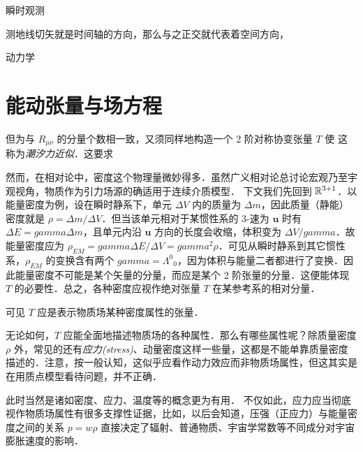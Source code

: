 瞬时观测




测地线切矢就是时间轴的方向，那么与之正交就代表着空间方向，


动力学





\section{能动张量与场方程}

但为与 $R_{\mu\nu}$ 的分量个数相一致，又须同样地构造一个 2 阶对称协变张量 $T$ 使
这称为\textit{潮汐力近似}．这要求

然而，在相对论中，密度这个物理量微妙得多．虽然广义相对论总讨论宏观乃至宇观视角，物质作为引力场源的确适用于连续介质模型．
下文我们先回到 $\mathbb{R}^{3+1}$．以能量密度为例，设在瞬时静系下，单元 $\Delta V$ 内的质量为 $\Delta m$，因此质量（静能）密度就是 $\rho=\Delta m/\Delta V$．但当该单元相对于某惯性系的 3-速为 $\bm{u}$ 时有 $\Delta E=gamma \Delta m$，且单元内沿 $\bm u$ 方向的长度会收缩，体积变为 $\Delta V/gamma$．故能量密度应为 $\rho_{EM}=gamma\Delta E/\Delta V=gamma^2\rho$．可见从瞬时静系到其它惯性系，$\rho_{EM}$ 的变换含有两个 $gamma=\Lambda^0{}_{0}$，因为体积与能量二者都进行了变换．因此能量密度不可能是某个矢量的分量，而应是某个 2 阶张量的分量．这便能体现 $T$ 的必要性．总之，各种密度应视作绝对张量 $T$ 在某参考系的相对分量．

可见 $T$ 应是表示物质场某种密度属性的张量．

无论如何，$T$ 应能全面地描述物质场的各种属性．那么有哪些属性呢？除质量密度 $\rho$ 外，常见的还有\textit{应力(stress)}、动量密度这样一些量，这都是不能单靠质量密度描述的．注意，按一般认知，这似乎应看作动力效应而非物质场属性，但这其实是在用质点模型看待问题，并不正确．

此时当然是诸如密度、应力、温度等的概念更为有用．
不仅如此，应力应当彻底视作物质场属性有很多支撑性证据，比如，以后会知道，压强（正应力）与能量密度之间的关系 $p=w\rho$ 直接决定了辐射、普通物质、宇宙学常数等不同成分对宇宙膨胀速度的影响．
 



